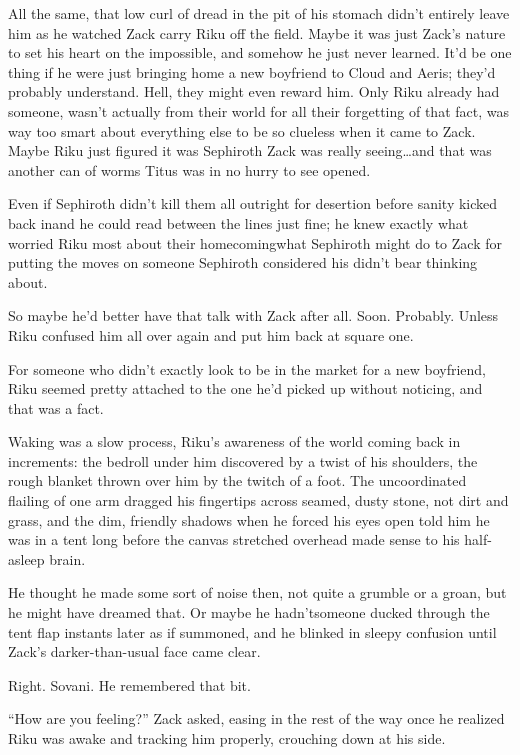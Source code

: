 All the same, that low curl of dread in the pit of his stomach didn't entirely leave him as he watched Zack carry Riku off the field. Maybe it was just Zack's nature to set his heart on the impossible, and somehow he just never learned. It'd be one thing if he were just bringing home a new boyfriend to Cloud and Aeris; they'd probably understand. Hell, they might even reward him. Only Riku already had someone, wasn't actually from their world for all their forgetting of that fact, was way too smart about everything else to be so clueless when it came to Zack. Maybe Riku just figured it was Sephiroth Zack was really seeing\ldots and that was another can of worms Titus was in no hurry to see opened.

Even if Sephiroth didn't kill them all outright for desertion before sanity kicked back in\textemdash and he could read between the lines just fine; he knew exactly what worried Riku most about their homecoming\textemdash what Sephiroth might do to Zack for putting the moves on someone Sephiroth considered his didn't bear thinking about.

So maybe he'd better have that talk with Zack after all. Soon. Probably. Unless Riku confused him all over again and put him back at square one.

For someone who didn't exactly look to be in the market for a new boyfriend, Riku seemed pretty attached to the one he'd picked up without noticing, and that was a fact.


\scenechange


Waking was a slow process, Riku's awareness of the world coming back in increments: the bedroll under him discovered by a twist of his shoulders, the rough blanket thrown over him by the twitch of a foot. The uncoordinated flailing of one arm dragged his fingertips across seamed, dusty stone, not dirt and grass, and the dim, friendly shadows when he forced his eyes open told him he was in a tent long before the canvas stretched overhead made sense to his half-asleep brain.

He thought he made some sort of noise then, not quite a grumble or a groan, but he might have dreamed that. Or maybe he hadn't\textemdash someone ducked through the tent flap instants later as if summoned, and he blinked in sleepy confusion until Zack's darker-than-usual face came clear.

Right. Sovani. He remembered that bit.

``How are you feeling?'' Zack asked, easing in the rest of the way once he realized Riku was awake and tracking him properly, crouching down at his side.

